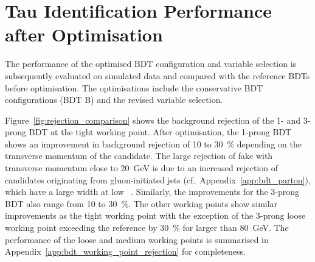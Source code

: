 

\section{Tau Identification Performance after Optimisation}
\label{sec:bdt_perf}
The performance of the optimised BDT configuration and variable selection is
subsequently evaluated on simulated data and compared with the reference BDTs
before optimisation. The optimisations include the conservative BDT
configurations (BDT B) and the revised variable selection.

Figure~\ref{fig:rejection_comparison} shows the background rejection of the 1-
and 3-prong BDT at the tight working point. After optimisation, the 1-prong BDT
shows an improvement in background rejection of \num{10} to \SI{30}{\percent}
depending on the transverse momentum of the \tauhadvis candidate. The large
rejection of fake \tauhadvis with transverse momentum close to \SI{20}{\GeV} is
due to an increased rejection of \tauhadvis candidates originating from
gluon-initiated jets (cf.\ Appendix~\ref{app:bdt_parton}), which have a large
width at low \tauhadvis~\pt. Similarly, the improvements for the 3-prong BDT
also range from \num{10} to \SI{30}{\percent}. The other working points show
similar improvements as the tight working point with the exception of the
3-prong loose working point exceeding the reference by \SI{30}{\percent} for
\tauhadvis \pt larger than \SI{80}{\GeV}. The performance of the loose and
medium working points is summarised in
Appendix~\ref{app:bdt_working_point_rejection} for completeness.

